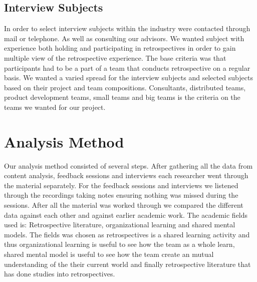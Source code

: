 \subsection{Interview Subjects }
\label{subsec:Interview-Subjects}
In order to select interview subjects within the industry were contacted through mail or telephone. As well as consulting our advisors. We wanted subject with experience both holding and participating in retrospectives in order to gain multiple view of the retrospective experience. The base criteria was that participants had to be a part of a team that conducts retrospective on a regular basis. We wanted a varied spread for the interview subjects and selected subjects based on their project and team compositions. Consultants, distributed teams, product development teams, small teams and big teams is the criteria on the teams we wanted for our project.

\section{Analysis Method}
Our analysis method consisted of several steps. After gathering all the data from content analysis, feedback sessions and interviews each researcher went through the material separately. For the feedback sessions and interviews we listened through the recordings taking notes ensuring nothing was missed during the sessions. After all the material was worked through we compared the different data against each other and against earlier academic work. The academic fields used is: Retrospective literature, organizational learning and shared mental models. The fields was chosen as retrospectives is a shared learning activity and thus organizational learning is useful to see how the team as a whole learn, shared mental model is useful to see how the team create an mutual understanding of the their current world and finally retrospective literature that has done studies into retrospectives.


